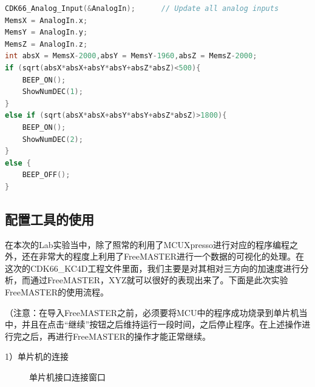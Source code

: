 \begin{lstlisting}[language = C++]
CDK66_Analog_Input(&AnalogIn);		// Update all analog inputs
MemsX = AnalogIn.x;
MemsY = AnalogIn.y;
MemsZ = AnalogIn.z;
int absX = MemsX-2000,absY = MemsY-1960,absZ = MemsZ-2000;
if (sqrt(absX*absX+absY*absY+absZ*absZ)<500){
    BEEP_ON();
    ShowNumDEC(1);
}
else if (sqrt(absX*absX+absY*absY+absZ*absZ)>1800){
    BEEP_ON();
    ShowNumDEC(2);
}
else {
	BEEP_OFF();
}

\end{lstlisting}


\subsection{配置工具的使用}
\par{在本次的Lab实验当中，除了照常的利用了MCUXpresso进行对应的程序编程之外，还在非常大的程度上利用了FreeMASTER进行一个数据的可视化的处理。在这次的CDK66\_KC4D工程文件里面，我们主要是对其相对三方向的加速度进行分析，而通过FreeMASTER，XYZ就可以很好的表现出来了。下面是此次实验FreeMASTER的使用流程。}
\par{（注意：在导入FreeMASTER之前，必须要将MCU中的程序成功烧录到单片机当中，并且在点击“继续”按钮之后维持运行一段时间，之后停止程序。在上述操作进行完之后，再进行FreeMASTER的操作才能正常继续。}
\\
\par{1）单片机的连接}

\begin{figure}[htbp]
\centering

%
%

\centering
\caption{单片机接口连接窗口}\label{fig:3.1.1}
\end{figure}

